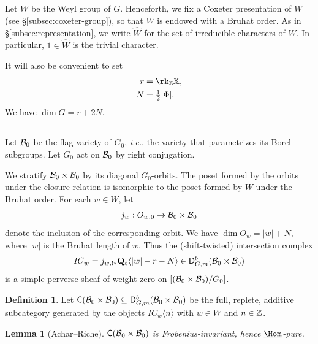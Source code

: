 \documentclass[a4paper,10pt,leqno]{amsart}
\theoremstyle{plain}
\theoremstyle{plain}
\theoremstyle{plain}
\newtheorem{lem}[thm]{Lemma}
\theoremstyle{definition}
\newtheorem{df}[thm]{Definition}
\theoremstyle{remark}
\newcommand{\IC}{\mathit{IC}}
\newcommand{\QL}{\bar{\mathbf{Q}}_\ell}
\begin{document}
\subsection{}

Let $W$ be the Weyl group of $G$.
Henceforth, we fix a Coxeter presentation of $W$ (see \S\ref{subsec:coxeter-group}), so that $W$ is endowed with a Bruhat order.
As in \S\ref{subsec:representation}, we write $\hat{W}$ for the set of irreducible characters of $W$.
In particular, $1 \in \hat{W}$ is the trivial character.

It will also be convenient to set 
\begin{align}
r &= \rk_\bb{Z} \bb{X},\\
N &= \tfrac{1}{2} |\Phi|.
\end{align}
We have $\dim G = r + 2N$.

\subsection{}

Let $\cal{B}_0$ be the flag variety of $G_0$, \emph{i.e.}, the variety that parametrizes its Borel subgroups.
Let $G_0$ act on $\cal{B}_0$ by right conjugation.

We stratify $\cal{B}_0 \times \cal{B}_0$ by its diagonal $G_0$-orbits.
The poset formed by the orbits under the closure relation is isomorphic to the poset formed by $W$ under the Bruhat order.
For each $w \in W$, let
\begin{align}
j_w : O_{w, 0} \to \cal{B}_0 \times \cal{B}_0
\end{align}
denote the inclusion of the corresponding orbit.
We have $\dim O_w = |w| + N$, where $|w|$ is the Bruhat length of $w$.
Thus the (shift-twisted) intersection complex
\begin{align}
\IC_w = j_{w, !\ast}\QL\langle |w| - r - N\rangle \in \sf{D}_{G, m}^b(\cal{B}_0 \times \cal{B}_0)
\end{align}
is a simple perverse sheaf of weight zero on $[(\cal{B}_0 \times \cal{B}_0)/G_0]$.

\begin{df}
Let $\sf{C}(\cal{B}_0 \times \cal{B}_0) \subseteq \sf{D}_{G, m}^b(\cal{B}_0 \times \cal{B}_0)$ be the full, replete, additive subcategory generated by the objects $\IC_w\langle n\rangle$ with $w \in W$ and $n \in \bb{Z}$.
\end{df}

\begin{lem}[Achar--Riche]\label{lem:frob-invariance-bruhat}
$\sf{C}(\cal{B}_0 \times \cal{B}_0)$ is Frobenius-invariant, hence $\SHom$-pure.
\end{lem}
\end{document}
